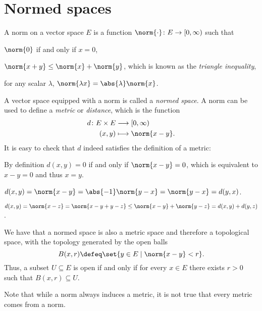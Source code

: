 \documentclass[12pt,oneside]{book}
\begin{document}
\section{Normed spaces}
\begin{definition}[Norm]
	A norm on a vector space \( E \) is a function \( \norm{\cdot} \colon E \to [0, \infty)
	\) such that
	\begin{points}
	\item \( \norm{0} \) if and only if \( x = 0 \),
	\item \( \norm{x + y} \leq \norm{x} + \norm{y} \), which is known as the \emph{triangle
		inequality},
	\item for any scalar \( \lambda \), \( \norm{\lambda x} = \abs{\lambda}\norm{x} \).
	\end{points}
\end{definition}

A vector space equipped with a norm is called a \emph{normed space}. A norm can be used to
define a \emph{metric} or \emph{distance}, which is the function
\begin{align*}
	d \colon E \times E & \longrightarrow [0,\infty) \\
	(x,y) & \longmapsto \norm{x - y}.
\end{align*}
It is easy to check that \( d \) indeed satisfies the definition of a metric:
\begin{points}
\item By definition \( d(x,y) = 0 \) if and only if \( \norm{x - y} = 0 \), which is
	equivalent to \( x - y = 0 \) and thus \( x = y \).
\item \( d(x,y) = \norm{x - y} = \abs{-1}\norm{y - x} = \norm{y - x} = d(y,x) \).
\item \( d(x,y) = \norm{x - z} = \norm{x - y + y - z} \leq \norm{x - y} + \norm{y - z} =
	d(x,y) + d(y,z) \).
\end{points}

We have that a normed space is also a metric space and therefore a topological space, with
the topology generated by the open balls
\begin{equation*}
	B(x,r) \defeq \set{y \in E \mid \norm{x - y} < r}.
\end{equation*}
Thus, a subset \( U \subseteq E \) is open if and only if for every \( x \in E \) there
exists \( r > 0 \) such that \( B(x,r) \subseteq U \).

Note that while a norm always induces a metric, it is not true that every metric comes
from a norm.
\end{document}
